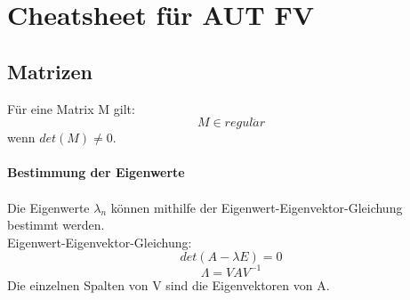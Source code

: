 \documentclass[12pt]{article}
\begin{document}
\section{Cheatsheet für AUT FV}
\subsection{Matrizen}
Für eine Matrix M gilt:
\[ M \in regul\ddot{a}r\] 
wenn $ det(M) \neq 0 $. \\ \\
\textbf{Bestimmung der Eigenwerte} \\ \\
Die Eigenwerte $ \lambda_{n} $ können mithilfe der Eigenwert-Eigenvektor-Gleichung bestimmt werden. \\
Eigenwert-Eigenvektor-Gleichung:
\[ det(A - \lambda E) = 0 \]
\[ \Lambda = VAV^{-1} \] 
Die einzelnen Spalten von V sind die Eigenvektoren von A.
\end{document}
